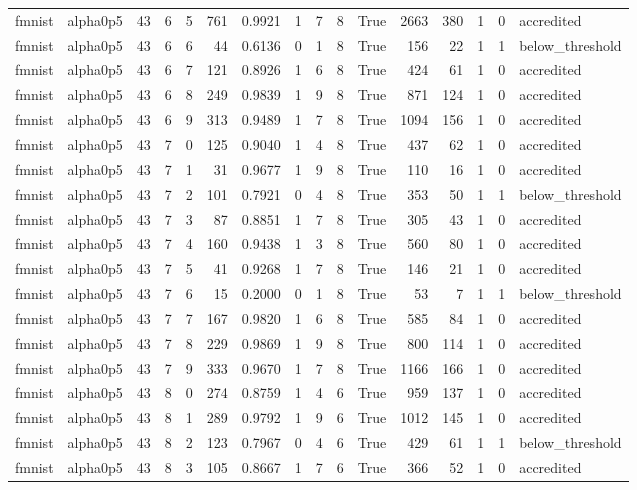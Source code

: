 \begin{tabular}{llrrrrrrrrrrrrrl}
fmnist & alpha0p5 & 43 & 6 & 5 & 761 & 0.9921 & 1 & 7 & 8 & True & 2663 & 380 & 1 & 0 & accredited \\
fmnist & alpha0p5 & 43 & 6 & 6 & 44 & 0.6136 & 0 & 1 & 8 & True & 156 & 22 & 1 & 1 & below\_threshold \\
fmnist & alpha0p5 & 43 & 6 & 7 & 121 & 0.8926 & 1 & 6 & 8 & True & 424 & 61 & 1 & 0 & accredited \\
fmnist & alpha0p5 & 43 & 6 & 8 & 249 & 0.9839 & 1 & 9 & 8 & True & 871 & 124 & 1 & 0 & accredited \\
fmnist & alpha0p5 & 43 & 6 & 9 & 313 & 0.9489 & 1 & 7 & 8 & True & 1094 & 156 & 1 & 0 & accredited \\
fmnist & alpha0p5 & 43 & 7 & 0 & 125 & 0.9040 & 1 & 4 & 8 & True & 437 & 62 & 1 & 0 & accredited \\
fmnist & alpha0p5 & 43 & 7 & 1 & 31 & 0.9677 & 1 & 9 & 8 & True & 110 & 16 & 1 & 0 & accredited \\
fmnist & alpha0p5 & 43 & 7 & 2 & 101 & 0.7921 & 0 & 4 & 8 & True & 353 & 50 & 1 & 1 & below\_threshold \\
fmnist & alpha0p5 & 43 & 7 & 3 & 87 & 0.8851 & 1 & 7 & 8 & True & 305 & 43 & 1 & 0 & accredited \\
fmnist & alpha0p5 & 43 & 7 & 4 & 160 & 0.9438 & 1 & 3 & 8 & True & 560 & 80 & 1 & 0 & accredited \\
fmnist & alpha0p5 & 43 & 7 & 5 & 41 & 0.9268 & 1 & 7 & 8 & True & 146 & 21 & 1 & 0 & accredited \\
fmnist & alpha0p5 & 43 & 7 & 6 & 15 & 0.2000 & 0 & 1 & 8 & True & 53 & 7 & 1 & 1 & below\_threshold \\
fmnist & alpha0p5 & 43 & 7 & 7 & 167 & 0.9820 & 1 & 6 & 8 & True & 585 & 84 & 1 & 0 & accredited \\
fmnist & alpha0p5 & 43 & 7 & 8 & 229 & 0.9869 & 1 & 9 & 8 & True & 800 & 114 & 1 & 0 & accredited \\
fmnist & alpha0p5 & 43 & 7 & 9 & 333 & 0.9670 & 1 & 7 & 8 & True & 1166 & 166 & 1 & 0 & accredited \\
fmnist & alpha0p5 & 43 & 8 & 0 & 274 & 0.8759 & 1 & 4 & 6 & True & 959 & 137 & 1 & 0 & accredited \\
fmnist & alpha0p5 & 43 & 8 & 1 & 289 & 0.9792 & 1 & 9 & 6 & True & 1012 & 145 & 1 & 0 & accredited \\
fmnist & alpha0p5 & 43 & 8 & 2 & 123 & 0.7967 & 0 & 4 & 6 & True & 429 & 61 & 1 & 1 & below\_threshold \\
fmnist & alpha0p5 & 43 & 8 & 3 & 105 & 0.8667 & 1 & 7 & 6 & True & 366 & 52 & 1 & 0 & accredited \\

\end{tabular}
